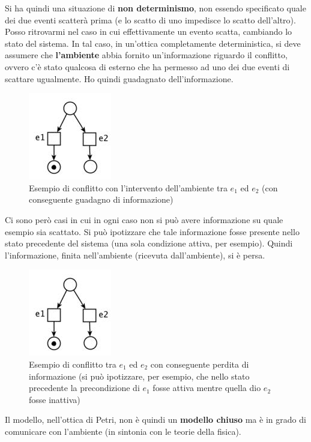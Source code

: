 \documentclass[a4paper,12pt, oneside]{book}
\begin{document}
\begin{definizione}
  Si ha quindi una situazione di \textbf{non determinismo}, non essendo
  specificato quale dei due eventi scatterà prima (e lo scatto di uno impedisce
  lo scatto dell'altro).
  \newpage
  Posso ritrovarmi nel caso in cui effettivamente un evento scatta, cambiando lo
  stato del sistema. In tal caso, in un'ottica completamente deterministica, si
  deve assumere che \textbf{l'ambiente} abbia fornito un'informazione
  riguardo il conflitto, ovvero c'è stato qualcosa di esterno che ha permesso ad
  uno dei due eventi di scattare ugualmente. Ho quindi guadagnato
  dell'informazione. 
  \begin{figure}[H]
    \centering
    \includegraphics[scale = 0.7]{img/conf3.jpg}
    \caption{Esempio di conflitto con l'intervento dell'ambiente tra $e_1$ ed
      $e_2$ (con conseguente guadagno di informazione)} 
  \end{figure}
  Ci sono però casi in cui in ogni caso non si può avere informazione su quale
  esempio sia scattato. Si può ipotizzare che tale informazione fosse presente
  nello stato precedente del sistema (una sola condizione attiva, per
  esempio). Quindi l'informazione, finita nell'ambiente (ricevuta
  dall'ambiente), si è persa.
  \begin{figure}[H]
    \centering
    \includegraphics[scale = 0.7]{img/conf3.jpg}
    \caption{Esempio di conflitto tra $e_1$ ed
      $e_2$ con conseguente perdita di informazione (si può ipotizzare, per
      esempio, che nello stato precedente la precondizione di $e_1$ fosse attiva
      mentre quella dio $e_2$ fosse inattiva)} 
  \end{figure}
  Il modello, nell'ottica di Petri, non è quindi un \textbf{modello chiuso} ma è
  in grado di comunicare con l'ambiente (in sintonia con le teorie della
  fisica). 
\end{definizione}
\newpage
\end{document}
